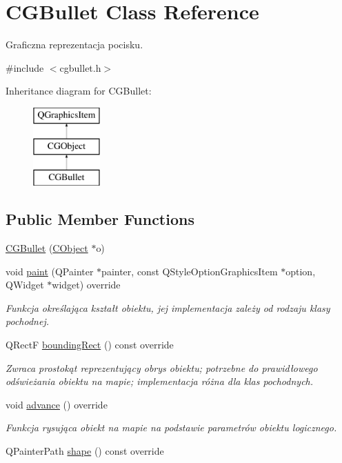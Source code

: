 \hypertarget{class_c_g_bullet}{}\section{C\+G\+Bullet Class Reference}
\label{class_c_g_bullet}


Graficzna reprezentacja pocisku.  




{\ttfamily \#include $<$cgbullet.\+h$>$}

Inheritance diagram for C\+G\+Bullet\+:\begin{figure}[H]
\begin{center}
\leavevmode
\includegraphics[height=3.000000cm]{class_c_g_bullet}
\end{center}
\end{figure}
\subsection*{Public Member Functions}
\begin{DoxyCompactItemize}
\item 
\mbox{\hyperlink{class_c_g_bullet_adb7c1130f83ecdbf16586a5e4adbca0b}{C\+G\+Bullet}} (\mbox{\hyperlink{class_c_object}{C\+Object}} $\ast$o)
\item 
void \mbox{\hyperlink{class_c_g_bullet_ad64e0666c42b0d65bb90ad37998252d0}{paint}} (Q\+Painter $\ast$painter, const Q\+Style\+Option\+Graphics\+Item $\ast$option, Q\+Widget $\ast$widget) override
\begin{DoxyCompactList}\small\item\em Funkcja określająca kształt obiektu, jej implementacja zależy od rodzaju klasy pochodnej. \end{DoxyCompactList}\item 
Q\+RectF \mbox{\hyperlink{class_c_g_bullet_a7be9c986a5c21d0a27dd5d64b209a82d}{bounding\+Rect}} () const override
\begin{DoxyCompactList}\small\item\em Zwraca prostokąt reprezentujący obrys obiektu; potrzebne do prawidłowego odświeżania obiektu na mapie; implementacja różna dla klas pochodnych. \end{DoxyCompactList}\item 
void \mbox{\hyperlink{class_c_g_bullet_a3f1f31f6225a94b09ea8493e5b2040a8}{advance}} () override
\begin{DoxyCompactList}\small\item\em Funkcja rysująca obiekt na mapie na podstawie parametrów obiektu logicznego. \end{DoxyCompactList}\item 
Q\+Painter\+Path \mbox{\hyperlink{class_c_g_bullet_a6e202930dce8f614c5acb55de035bda2}{shape}} () const override
\end{DoxyCompactItemize}

